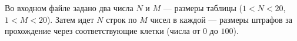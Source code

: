 Во входном файле задано два числа $N$ и $M$ --- размеры таблицы 
($1 < N < 20$, $1 < M < 20$). 
Затем идет $N$ строк по $M$ чисел в каждой ---
размеры штрафов за прохождение через 
соответствующие клетки (числа от $0$ до $100$).
